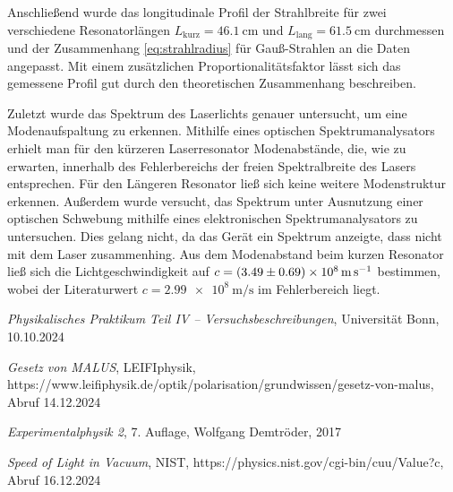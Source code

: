 \documentclass{article}
\newcommand{\mr}{\mathrm}
\begin{document}
Anschließend wurde das longitudinale Profil der Strahlbreite für zwei verschiedene Resonatorlängen
$L_\mr{kurz} = \SI{46.1}{\cm}$ und $L_\mr{lang} = \SI{61.5}{\cm}$ durchmessen und
der Zusammenhang \eqref{eq:strahlradius} für Gauß-Strahlen an die Daten angepasst.
Mit einem zusätzlichen Proportionalitätsfaktor lässt sich das gemessene Profil
gut durch den theoretischen Zusammenhang beschreiben.

Zuletzt wurde das Spektrum des Laserlichts genauer untersucht, um eine Modenaufspaltung zu erkennen.
Mithilfe eines optischen Spektrumanalysators erhielt man für den kürzeren Laserresonator Modenabstände,
die, wie zu erwarten, innerhalb des Fehlerbereichs der freien Spektralbreite des Lasers entsprechen.
Für den Längeren Resonator ließ sich keine weitere Modenstruktur erkennen.
Außerdem wurde versucht, das Spektrum unter Ausnutzung einer optischen Schwebung mithilfe eines elektronischen
Spektrumanalysators zu untersuchen. Dies gelang nicht, da das Gerät ein Spektrum anzeigte, dass nicht mit dem Laser zusammenhing.
Aus dem Modenabstand beim kurzen Resonator ließ sich die Lichtgeschwindigkeit auf 
$c=\SI{3.49\pm0.69e8}{\m\per\s}$ bestimmen, wobei der Literaturwert $c =\SI{2.99e8}{\m\per\s}$ \cite{c} im Fehlerbereich liegt.





\clearpage
\begin{thebibliography}{9}

\textit{Physikalisches Praktikum Teil IV -- Versuchsbeschreibungen}, Universität Bonn, 10.10.2024

\textit{Gesetz von MALUS}, LEIFIphysik, https://www.leifiphysik.de/optik/polarisation/grundwissen/gesetz-von-malus, Abruf 14.12.2024

\textit{Experimentalphysik 2}, 7. Auflage, Wolfgang Demtröder, 2017

\textit{Speed of Light in Vacuum}, NIST, https://physics.nist.gov/cgi-bin/cuu/Value?c, Abruf 16.12.2024

\end{thebibliography}
\end{document}
